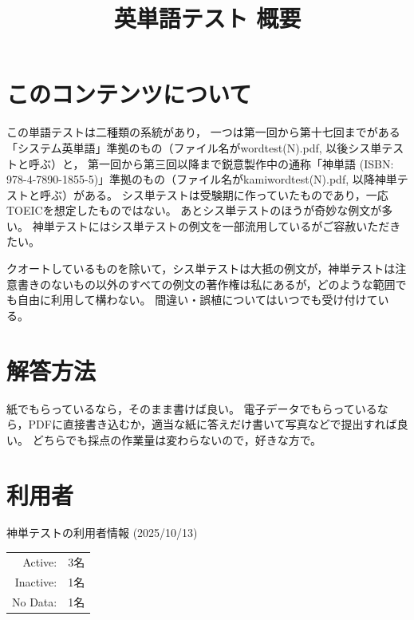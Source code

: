 \documentclass[a4paper]{ltjsarticle}
\title{英単語テスト 概要}
\date{}
\begin{document}
\maketitle

\section{このコンテンツについて}
この単語テストは二種類の系統があり，
一つは第一回から第十七回までがある「システム英単語」準拠のもの（ファイル名がwordtest(N).pdf, 以後シス単テストと呼ぶ）と，
第一回から第三回以降まで鋭意製作中の通称「神単語 (ISBN: 978-4-7890-1855-5)」準拠のもの（ファイル名がkamiwordtest(N).pdf, 以降神単テストと呼ぶ）がある。
シス単テストは受験期に作っていたものであり，一応TOEICを想定したものではない。
あとシス単テストのほうが奇妙な例文が多い。
神単テストにはシス単テストの例文を一部流用しているがご容赦いただきたい。

クオートしているものを除いて，シス単テストは大抵の例文が，神単テストは注意書きのないもの以外のすべての例文の著作権は私にあるが，どのような範囲でも自由に利用して構わない。
間違い・誤植についてはいつでも受け付けている。

\section{解答方法}
紙でもらっているなら，そのまま書けば良い。
電子データでもらっているなら，PDFに直接書き込むか，適当な紙に答えだけ書いて写真などで提出すれば良い。
どちらでも採点の作業量は変わらないので，好きな方で。

\section{利用者}
神単テストの利用者情報 (2025/10/13)

\begin{tabular}{rl}
  Active: & 3名\\
  Inactive: & 1名\\
  No Data: & 1名
\end{tabular}
\end{document}
